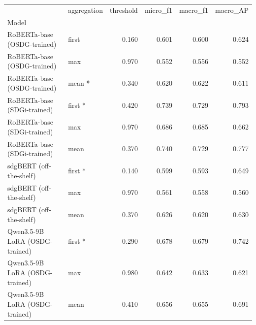 \begin{tabular}{llrrrr}
\toprule
 & aggregation & threshold & micro_f1 & macro_f1 & macro_AP \\
Model &  &  &  &  &  \\
\midrule
RoBERTa-base (OSDG-trained) & first & 0.160 & 0.601 & 0.600 & 0.624 \\
RoBERTa-base (OSDG-trained) & max & 0.970 & 0.552 & 0.556 & 0.552 \\
RoBERTa-base (OSDG-trained) & mean * & 0.340 & 0.620 & 0.622 & 0.611 \\
RoBERTa-base (SDGi-trained) & first * & 0.420 & 0.739 & 0.729 & 0.793 \\
RoBERTa-base (SDGi-trained) & max & 0.970 & 0.686 & 0.685 & 0.662 \\
RoBERTa-base (SDGi-trained) & mean & 0.370 & 0.740 & 0.729 & 0.777 \\
sdgBERT (off-the-shelf) & first * & 0.140 & 0.599 & 0.593 & 0.649 \\
sdgBERT (off-the-shelf) & max & 0.970 & 0.561 & 0.558 & 0.560 \\
sdgBERT (off-the-shelf) & mean & 0.370 & 0.626 & 0.620 & 0.630 \\
Qwen3.5-9B LoRA (OSDG-trained) & first * & 0.290 & 0.678 & 0.679 & 0.742 \\
Qwen3.5-9B LoRA (OSDG-trained) & max & 0.980 & 0.642 & 0.633 & 0.621 \\
Qwen3.5-9B LoRA (OSDG-trained) & mean & 0.410 & 0.656 & 0.655 & 0.691 \\
\bottomrule
\end{tabular}
